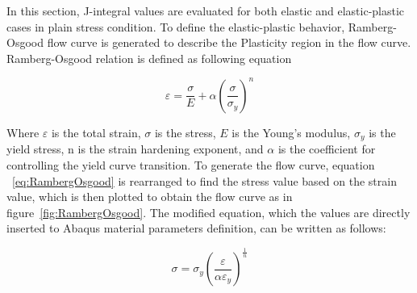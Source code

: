\documentclass[12pt]{article}
\begin{document}
\newpage
\vspace{1em}

\vspace{1em}
\hspace{1em}In this section, J-integral values are evaluated for both elastic and elastic-plastic cases in plain stress
condition. To define the elastic-plastic behavior, Ramberg-Osgood flow curve is generated to describe the Plasticity
region in the flow curve. Ramberg-Osgood relation is defined as following equation

\begin{equation}
    \varepsilon = \frac{\sigma}{E} + \alpha \left( \frac{\sigma}{\sigma_y} \right)^n
    \label{eq:RambergOsgood}
\end{equation}

\hspace{1em}Where $\varepsilon$ is the total strain, $\sigma$ is the stress, 
$E$ is the Young's modulus, $\sigma_y$ is the yield stress, n is the strain hardening exponent,
and $\alpha$ is the coefficient for controlling the yield curve transition. To generate the flow curve, equation
~\ref{eq:RambergOsgood} is rearranged to find the stress value based on the strain value, 
which is then plotted to obtain the flow curve as in figure~\ref{fig:RambergOsgood}. The modified equation, which the values are directly
inserted to Abaqus material parameters definition, can be written as follows:

\begin{equation}
    \sigma = \sigma_y \left( \frac{\varepsilon}{\alpha \varepsilon_y} \right)^{\frac{1}{n}}
    \label{eq:modifiedRambergOsgood}
\end{equation}
\end{document}
